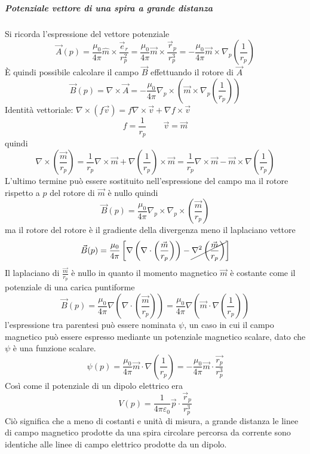 
\subparagraph{Potenziale vettore di una spira a grande distanza}
Si ricorda l'espressione del vettore potenziale
$$
\vec{A}(p) = \frac{\mu_0}{4\pi}\hat{m}\times\frac{\vec{e}_r}{r_p^2} = \frac{\mu_0}{4\pi}\vec{m}\times\frac{\vec{r}_p}{r_p^3} = -\frac{\mu_0}{4\pi}\vec{m}\times\nabla_p \left(\frac{1}{r_p} \right)
$$
È quindi possibile calcolare il campo $\vec{B}$ effettuando il rotore di $\vec{A}$
$$
\vec{B}(p) = \nabla\times\vec{A} = -\frac{\mu_0}{4\pi}\nabla_p\times\left(\vec{m}\times\nabla_p\left(\frac{1}{r_p}\right)\right)
$$
Identità vettoriale: $\nabla\times(f\vec{v}) = f\nabla\times\vec{v} + \nabla f \times \vec{v}$
$$
f = \frac{1}{r_p} \qquad \vec{v}=\vec{m}
$$
quindi
$$
\nabla\times\left(\frac{\vec{m}}{r_p}\right) = \frac{1}{r_p}\nabla\times\vec{m} + \nabla\left(\frac{1}{r_p}\right)\times \vec{m} = \frac{1}{r_p}\nabla\times\vec{m} - \vec{m}\times\nabla\left(\frac{1}{r_p}\right)
$$
L'ultimo termine può essere sostituito nell'espressione del campo ma il rotore rispetto
a $p$ del rotore di $\vec{m}$ è nullo quindi
$$
\vec{B}(p) = \frac{\mu_0}{4\pi} \nabla_p\times\nabla_p\times\left(\frac{\vec{m}}{r_p}\right)
$$
ma il rotore del rotore è il gradiente della divergenza meno il laplaciano vettore
$$
\vec{B}(p) = \frac{\mu_0}{4\pi} \left[\nabla\left(\nabla\cdot\left(\frac{\vec{m}}{r_p}\right)\right) - \cancel{\nabla^2\left(\frac{\vec{m}}{r_p}\right)}\right]
$$
Il laplaciano di $\frac{\vec{m}}{r_p}$ è nullo in quanto il momento magnetico $\vec{m}$ è 
costante come il potenziale di una carica puntiforme
$$
\vec{B}(p) = \frac{\mu_0}{4\pi}\nabla\left(\nabla\cdot\left(\frac{\vec{m}}{r_p}\right)\right) = \frac{\mu_0}{4\pi}\nabla\left(\vec{m}\cdot\nabla\left(\frac{1}{r_p}\right)\right)
$$
l'espressione tra parentesi può essere nominata $\psi$, un caso in cui il campo magnetico
può essere espresso mediante un potenziale magnetico scalare, dato che $\psi$ è una funzione 
scalare.
$$
\psi(p) = \frac{\mu_0}{4\pi}\vec{m}\cdot\nabla\left(\frac{1}{r_p}\right) = -\frac{\mu_0}{4\pi}\vec{m}\cdot \frac{\vec{r_p}}{r_p^3}
$$
Così come il potenziale di un dipolo elettrico era
$$
V(p) = \frac{1}{4\pi\varepsilon_0} \vec{p}\cdot\frac{\vec{r}_p}{r_p^3}
$$
Ciò significa che a meno di costanti e unità di misura, a grande distanza le linee di
campo magnetico prodotte da una spira circolare percorsa da corrente sono identiche alle
linee di campo elettrico prodotte da un dipolo.
\newpage

